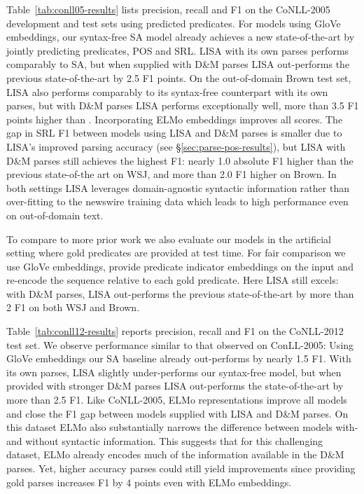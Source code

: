 \documentclass[11pt,a4paper]{article}
\begin{document}
Table~\ref{tab:conll05-results} lists precision, recall and F1 on the CoNLL-2005 development and test sets using predicted predicates. For models using GloVe embeddings, our syntax-free SA model already achieves a new state-of-the-art by jointly predicting predicates, POS and SRL. LISA with its own parses performs comparably to SA, but when supplied with D\&M parses LISA out-performs the previous state-of-the-art by 2.5 F1 points. On the out-of-domain Brown test set, LISA also performs comparably to its syntax-free counterpart with its own parses, but with D\&M parses LISA performs exceptionally well, more than 3.5 F1 points higher than \citet{he2018jointly}. Incorporating ELMo embeddings improves all scores. The gap in SRL F1 between models using LISA and D\&M parses is smaller due to LISA's improved parsing accuracy (see \S\ref{sec:parse-pos-results}), but LISA with D\&M parses still achieves the highest F1: nearly 1.0 absolute F1 higher than the previous state-of-the art on WSJ, and more than 2.0 F1 higher on Brown. In both settings LISA leverages domain-agnostic syntactic information rather than over-fitting to the newswire training data which leads to high performance even on out-of-domain text.

To compare to more prior work we also evaluate our models in the artificial setting where gold predicates are provided at test time. For fair comparison we use GloVe embeddings, provide predicate indicator embeddings on the input and re-encode the sequence relative to each gold predicate. Here LISA still excels: with D\&M parses, LISA out-performs the previous state-of-the-art by more than 2 F1 on both WSJ and Brown. 

Table~\ref{tab:conll12-results} reports precision, recall and F1 on the CoNLL-2012 test set. We observe performance similar to that observed on ConLL-2005: Using GloVe embeddings our SA baseline already out-performs \citet{he2018jointly} by nearly 1.5 F1. With its own parses, LISA slightly under-performs our syntax-free model, but when provided with stronger D\&M parses LISA out-performs the state-of-the-art by more than 2.5 F1. Like CoNLL-2005, ELMo representations improve all models and close the F1 gap between models supplied with LISA and D\&M parses. On this dataset ELMo also substantially narrows the difference between models with- and without syntactic information. This suggests that for this challenging dataset, ELMo already encodes much of the information available in the D\&M parses. Yet, higher accuracy parses could still yield improvements since providing gold parses increases F1 by 4 points even with ELMo embeddings.
\end{document}

